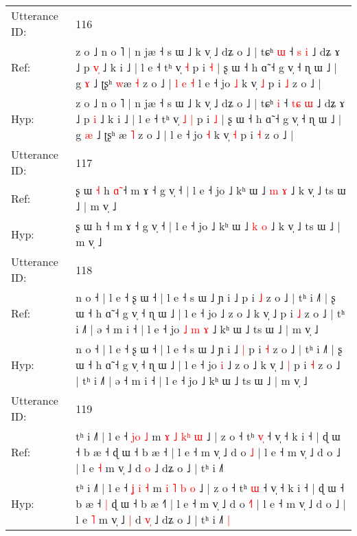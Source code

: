\documentclass[10pt]{article}
\DeclareRobustCommand{\hl}[1]{{\textcolor{red}{#1}}}
\begin{document}
\begin{longtable}{ll}
 \\
\midrule
Utterance ID: & 116 \\
Ref: & z o ˩ n o ˥ | n jæ ˧ s ɯ ˩ k v̩ ˩ dʑ o ˩ | tɕʰ \hl{ɯ} ˧ \hl{}\hl{s} \hl{i} ˩ dʑ ɤ ˩ p \hl{v}\hl{̩} ˩ k i ˩ | l e ˧ tʰ v̩\hl{}\hl{} \hl{˧} p i \hl{˧} | ʂ ɯ ˧ h ɑ̃ ˧ g v̩ ˧ ɳ ɯ ˩ | g \hl{ɤ} ˩ ʈʂʰ \hl{w}æ \hl{˧} z o ˩ |\hl{ }\hl{l}\hl{ }\hl{e}\hl{ }\hl{˧} l e ˧ jo \hl{˩} k v̩ \hl{˩} p i \hl{˩} z o ˩ |
 \\
Hyp: & z o ˩ n o ˥ | n jæ ˧ s ɯ ˩ k v̩ ˩ dʑ o ˩ | tɕʰ \hl{i} ˧ \hl{t}\hl{ɕ} \hl{ɯ} ˩ dʑ ɤ ˩ p \hl{}\hl{i} ˩ k i ˩ | l e ˧ tʰ v̩\hl{ }\hl{˩} \hl{|} p i \hl{˩} | ʂ ɯ ˧ h ɑ̃ ˧ g v̩ ˧ ɳ ɯ ˩ | g \hl{æ} ˩ ʈʂʰ \hl{}æ \hl{˥} z o ˩ |\hl{}\hl{}\hl{}\hl{}\hl{}\hl{} l e ˧ jo \hl{˧} k v̩ \hl{˧} p i \hl{˧} z o ˩ |
 \\
\midrule
Utterance ID: & 117 \\
Ref: & ʂ ɯ\hl{ }\hl{˧} h\hl{ }\hl{ɑ}\hl{̃} ˧ m ɤ ˧ g v̩ ˧ | l e ˧ jo ˩ kʰ ɯ ˩ \hl{m} \hl{ɤ} ˩ k v̩ ˩ ts ɯ ˩ | m v̩ ˩
 \\
Hyp: & ʂ ɯ\hl{}\hl{} h\hl{}\hl{}\hl{} ˧ m ɤ ˧ g v̩ ˧ | l e ˧ jo ˩ kʰ ɯ ˩ \hl{k} \hl{o} ˩ k v̩ ˩ ts ɯ ˩ | m v̩ ˩
 \\
\midrule
Utterance ID: & 118 \\
Ref: & n o ˧ | l e ˧ ʂ ɯ ˧ | l e ˧ s ɯ ˩ ɲ i ˩\hl{}\hl{} p i \hl{˩} z o ˩ | tʰ i ˩˥ | ʂ ɯ ˧ h ɑ̃ ˧ g v̩ ˧ ɳ ɯ ˩ | l e ˧ jo\hl{}\hl{} ˩ z o ˩ k v̩ ˩\hl{}\hl{} p i \hl{˩} z o ˩ | tʰ i ˩˥ | ə ˧ m i ˧ | l e ˧ jo\hl{ }\hl{˩}\hl{ }\hl{m}\hl{ }\hl{ɤ} ˩ kʰ ɯ ˩ ts ɯ ˩ | m v̩ ˩
 \\
Hyp: & n o ˧ | l e ˧ ʂ ɯ ˧ | l e ˧ s ɯ ˩ ɲ i ˩\hl{ }\hl{|} p i \hl{˧} z o ˩ | tʰ i ˩˥ | ʂ ɯ ˧ h ɑ̃ ˧ g v̩ ˧ ɳ ɯ ˩ | l e ˧ jo\hl{ }\hl{i} ˩ z o ˩ k v̩ ˩\hl{ }\hl{|} p i \hl{˧} z o ˩ | tʰ i ˩˥ | ə ˧ m i ˧ | l e ˧ jo\hl{}\hl{}\hl{}\hl{}\hl{}\hl{} ˩ kʰ ɯ ˩ ts ɯ ˩ | m v̩ ˩
 \\
\midrule
Utterance ID: & 119 \\
Ref: & tʰ i ˩˥ | l e ˧ \hl{}\hl{j}\hl{o} \hl{˩} m \hl{ɤ} \hl{˩} \hl{k}\hl{ʰ} \hl{ɯ} ˩ | z o ˧ tʰ \hl{v}\hl{̩} ˧ v̩ ˧ k i ˧ | ɖ ɯ ˧ b æ ˧\hl{}\hl{} ɖ ɯ ˧ b æ ˧\hl{} | l e ˧ m v̩ ˩ d o \hl{}\hl{˩} | l e ˧ m v̩ ˩ d o ˩ | l e \hl{˧} m v̩ ˩\hl{}\hl{} d \hl{}\hl{o} ˩ dʑ o ˩ | tʰ i ˩˥\hl{}\hl{}
 \\
Hyp: & tʰ i ˩˥ | l e ˧ \hl{ʝ}\hl{ }\hl{i} \hl{˧} m \hl{i} \hl{˥} \hl{}\hl{b} \hl{o} ˩ | z o ˧ tʰ \hl{}\hl{ɯ} ˧ v̩ ˧ k i ˧ | ɖ ɯ ˧ b æ ˧\hl{ }\hl{|} ɖ ɯ ˧ b æ ˧\hl{˥} | l e ˧ m v̩ ˩ d o \hl{˧}\hl{˥} | l e ˧ m v̩ ˩ d o ˩ | l e \hl{˥} m v̩ ˩\hl{ }\hl{|} d \hl{v}\hl{̩} ˩ dʑ o ˩ | tʰ i ˩˥\hl{ }\hl{|}

\end{longtable}
\end{document}
